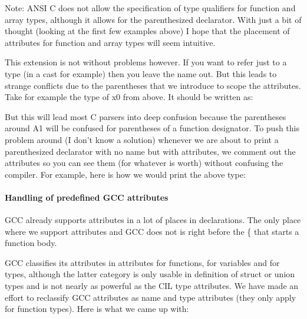 \documentclass[letterpaper]{article}
\begin{document}
 Note: ANSI C does not allow the specification of type qualifiers for function
and array types, although it allows for the parenthesized declarator. With
just a bit of thought (looking at the first few examples above) I hope that
the placement of attributes for function and array types will seem intuitive.

 This extension is not without problems however. If you want to refer just to
a type (in a cast for example) then you leave the name out. But this leads to
strange conflicts due to the parentheses that we introduce to scope the
attributes. Take for example the type of x0 from above. It should be written
as: 
 

 But this will lead most C parsers into deep confusion because the parentheses
around A1 will be confused for parentheses of a function designator. To push
this problem around (I don't know a solution) whenever we are about to print a
parenthesized declarator with no name but with attributes, we comment out the
attributes so you can see them (for whatever is worth) without confusing the
compiler. For example, here is how we would print the above type:


 \paragraph{Handling of predefined GCC attributes}

 GCC already supports attributes in a lot of places in declarations. The only
place where we support attributes and GCC does not is right before the \{ that
starts a function body. 

 GCC classifies its attributes in attributes for functions, for variables and
for types, although the latter category is only usable in definition of struct
or union types and is not nearly as powerful as the CIL type attributes. We
have made an effort to reclassify GCC attributes as name and type attributes
(they only apply for function types). Here is what we came up with:
\end{document}
